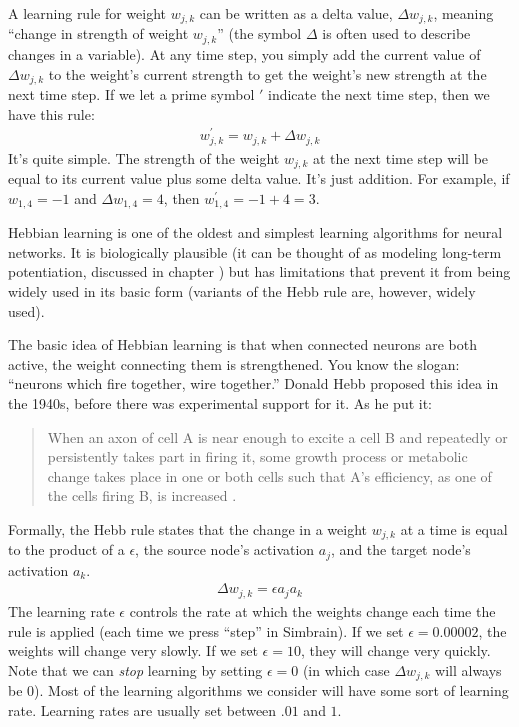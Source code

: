 A learning rule for weight $w_{j,k}$  can be written as a delta value,
$\Delta w_{j,k}$, meaning ``change in strength of weight $w_{j,k}$'' (the symbol $\Delta$ is often used to describe changes in a variable). At any
time step, you simply add the current value of $\Delta w_{j,k}$ to the weight's 
current strength to get the weight's new strength at the next time step. If we let a prime symbol $\prime$ indicate the next time step, then we have this rule:
\begin{eqnarray*}
w^\prime_{j,k} = w_{j,k} + \Delta w_{j,k}
\end{eqnarray*}
It's quite simple. The strength of the weight $w_{j,k}$ at the next time step will be equal to its current value plus some delta value. It's just addition. For example, if $w_{1,4} =-1$ and $\Delta w_{1,4} = 4$, then $w^\prime_{1,4}  = -1 + 4 = 3$. 

Hebbian learning is one of the oldest and simplest learning algorithms for neural networks. It is biologically plausible (it can be thought of as modeling long-term potentiation, discussed in chapter ) but has limitations that prevent it from being widely used in its basic form (variants of the Hebb rule are, however, widely used). 

The basic idea of Hebbian learning is that when connected neurons are both active, the weight connecting them is strengthened. You know the slogan: ``neurons which fire  together, wire together.'' Donald Hebb proposed this idea in the 1940s, before there was experimental  support for it. As he put it:
\begin{quote}
When an axon of cell A is near enough to excite a cell B and repeatedly or persistently takes part in firing it, some growth process or metabolic change takes place in one or both cells such that A's efficiency, as one of the cells firing B, is increased \cite{hebb2005organization}.
\end{quote}

Formally, the Hebb rule states that the change in a weight $w_{j,k}$ at a time is 
equal to the product of a  $\epsilon$, the source node's 
activation $a_j$, and the target node's activation $a_k$. 
\begin{eqnarray*}
\Delta w_{j,k} = \epsilon a_j a_k
\end{eqnarray*}
The learning rate $\epsilon$ controls the rate at which the weights change each time the rule is applied (each time we press ``step'' in Simbrain). If we set $\epsilon=0.00002$, the weights will change very slowly. If we set $\epsilon=10$, they will change very quickly. Note that we can \emph{stop} learning by setting $\epsilon=0$ (in which case $\Delta w_{j,k}$ will always be 0). Most of the learning algorithms we consider will have some sort of learning rate. Learning rates are usually set between $.01$ and $1$.

